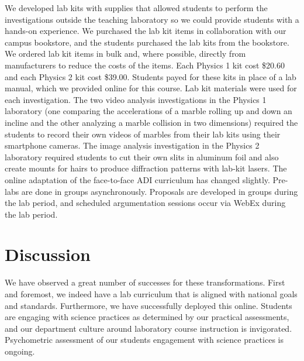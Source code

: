 \documentclass[aip, numerical, preprint]{revtex4-2}
\begin{document}
We developed lab kits with supplies that allowed students to perform the investigations outside
the teaching laboratory so we could provide students with a hands-on experience. We purchased
the lab kit items in collaboration with our campus bookstore, and the students purchased the
lab kits from the bookstore. We ordered lab kit items in bulk and, where possible, directly from
manufacturers to reduce the costs of the items. Each Physics 1 kit cost \$20.60 and each
Physics 2 kit cost \$39.00. Students payed for these kits in place of a lab manual, which we
provided online for this course. Lab kit materials were used for each investigation. The two video 
analysis investigations in the Physics 1 laboratory (one comparing the accelerations of a marble 
rolling up and down an incline and the other analyzing a marble collision in two dimensions) 
required the students to record their own videos of marbles from their lab kits using their 
smartphone cameras. The image analysis investigation in the 
Physics 2 laboratory required students to cut their own slits in aluminum foil and also create mounts 
for hairs to produce diffraction patterns with lab-kit lasers. The online adaptation of the face-to-face 
ADI curriculum has changed slightly. Pre-labs are done in groups asynchronously.  Proposals are 
developed in groups during the lab period, and scheduled argumentation sessions occur via 
WebEx during the lab period.

\section{Discussion}
We have observed a great number of successes for these transformations.  First and foremost, we
indeed have a lab curriculum that is aligned with national goals and standards. Furthermore, we
have successfully deployed this online.  Students are engaging with science practices as
determined by our practical assessments, and our department culture around laboratory course
instruction is invigorated. Psychometric assessment of our students engagement with science
practices is ongoing.
\end{document}
